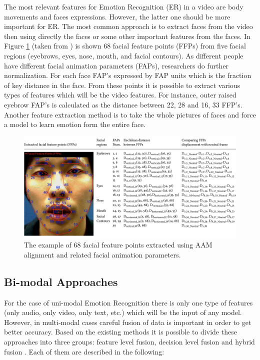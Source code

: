 \documentclass[oneside]{report}
\begin{document}
    The most relevant features for Emotion Recognition (ER) in a video are body movements and faces expressions. However, the latter one should be more important for ER. The most common approach is to extract faces from the video then using directly the faces or some other important features from the faces. In Figure \ref{fig:ffp} (taken from \cite{google_survey}) is shown 68 facial feature points (FFPs) from five facial regions (eyebrows, eyes, nose, mouth, and facial contours). As different people have different facial animation parameters (FAPs), researchers do further normalization. For each face FAP's expressed by FAP units which is the fraction of key distance in the face. From these points it is possible to extract various types of features which will be the video features. For instance, outer raised eyebrow FAP's is calculated as the distance between 22, 28 and 16, 33 FFP's. Another feature extraction method is to take the whole pictures of faces and force a model to learn emotion form the entire face. 
    
    
    \begin{figure}
    \centering
    \includegraphics[scale=0.5]{ffp.png}
    \caption{The example of 68 facial feature points extracted using AAM alignment and related facial animation parameters.}
    \label{fig:ffp}
    \end{figure}

\subsection{Bi-modal Approaches}

    For the case of uni-modal Emotion Recognition there is only one type of features (only audio, only video, only text, etc.) which will be the input of any model. However, in multi-modal cases careful fusion of data is important in order to get better accuracy. Based on the existing methods it is possible to divide these approaches into three groups: feature level fusion, decision level fusion and hybrid fusion \cite{feature_fusion1, feature_fusion2, feature_fusion3, china_2020, stanford_2020, india_2020, slovenia_2014, waterloo_2019, estonia_2018, stuttgart_2021, china_2020_1, india_2014}. Each of them are described in the following:
    
\end{document}
